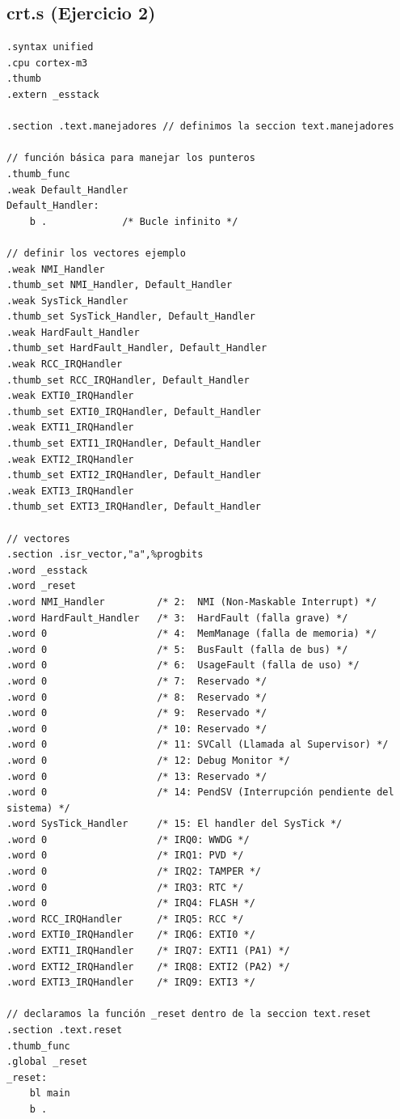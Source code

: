 \subsection{crt.s (Ejercicio 2)}
\begin{lstlisting}[language=MyMake]
.syntax unified 
.cpu cortex-m3
.thumb
.extern _esstack

.section .text.manejadores // definimos la seccion text.manejadores 

// función básica para manejar los punteros 
.thumb_func 
.weak Default_Handler
Default_Handler:
    b .             /* Bucle infinito */

// definir los vectores ejemplo
.weak NMI_Handler
.thumb_set NMI_Handler, Default_Handler
.weak SysTick_Handler
.thumb_set SysTick_Handler, Default_Handler
.weak HardFault_Handler
.thumb_set HardFault_Handler, Default_Handler
.weak RCC_IRQHandler
.thumb_set RCC_IRQHandler, Default_Handler
.weak EXTI0_IRQHandler
.thumb_set EXTI0_IRQHandler, Default_Handler
.weak EXTI1_IRQHandler
.thumb_set EXTI1_IRQHandler, Default_Handler
.weak EXTI2_IRQHandler
.thumb_set EXTI2_IRQHandler, Default_Handler
.weak EXTI3_IRQHandler
.thumb_set EXTI3_IRQHandler, Default_Handler

// vectores 
.section .isr_vector,"a",%progbits
.word _esstack
.word _reset
.word NMI_Handler         /* 2:  NMI (Non-Maskable Interrupt) */
.word HardFault_Handler   /* 3:  HardFault (falla grave) */
.word 0                   /* 4:  MemManage (falla de memoria) */
.word 0                   /* 5:  BusFault (falla de bus) */
.word 0                   /* 6:  UsageFault (falla de uso) */
.word 0                   /* 7:  Reservado */
.word 0                   /* 8:  Reservado */
.word 0                   /* 9:  Reservado */
.word 0                   /* 10: Reservado */
.word 0                   /* 11: SVCall (Llamada al Supervisor) */
.word 0                   /* 12: Debug Monitor */
.word 0                   /* 13: Reservado */
.word 0                   /* 14: PendSV (Interrupción pendiente del sistema) */
.word SysTick_Handler     /* 15: El handler del SysTick */
.word 0                   /* IRQ0: WWDG */
.word 0                   /* IRQ1: PVD */
.word 0                   /* IRQ2: TAMPER */
.word 0                   /* IRQ3: RTC */
.word 0                   /* IRQ4: FLASH */
.word RCC_IRQHandler      /* IRQ5: RCC */
.word EXTI0_IRQHandler    /* IRQ6: EXTI0 */
.word EXTI1_IRQHandler    /* IRQ7: EXTI1 (PA1) */
.word EXTI2_IRQHandler    /* IRQ8: EXTI2 (PA2) */
.word EXTI3_IRQHandler    /* IRQ9: EXTI3 */

// declaramos la función _reset dentro de la seccion text.reset
.section .text.reset
.thumb_func
.global _reset
_reset:
    bl main
    b .
\end{lstlisting}